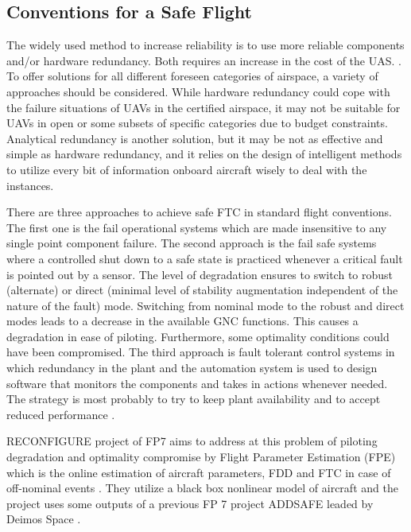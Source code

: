 \subsection{Conventions for a Safe Flight}\label{ch2:conventions}

The widely used method to increase reliability is to use more reliable components and/or hardware redundancy. 
Both requires an increase in the cost of the UAS.
\cite{angelov2012sense}. To offer solutions for all different foreseen categories of 
airspace, a variety of approaches should be considered. While hardware redundancy 
could cope with the failure situations of UAVs in the certified airspace, it may not be 
suitable for UAVs in open or some subsets of specific categories due to budget 
constraints. Analytical redundancy is another solution, but it may be not as effective and 
simple as hardware redundancy, and it relies on the design of intelligent methods to 
utilize every bit of information onboard aircraft wisely to deal with the instances.  

There are three approaches to achieve safe FTC in standard flight conventions. 
The first one is the fail operational systems which are made insensitive to any single 
point component failure. The second approach is the fail safe systems where a 
controlled shut down to a safe state is practiced whenever a critical fault is pointed 
out by a sensor. The level of degradation ensures to switch to robust (alternate) or 
direct (minimal level of stability augmentation independent of the nature of the fault) mode. 
Switching from nominal mode to the robust and direct modes leads to a decrease 
in the available GNC functions. This causes a degradation in ease of piloting. Furthermore, some optimality conditions could have been compromised. The third approach 
is fault tolerant control systems in which redundancy in the plant and the automation 
system is used to design software that monitors the components and takes in 
actions whenever needed. The strategy is most probably to try to keep plant availability 
and to accept reduced performance \cite{blanke2000fault}.

RECONFIGURE project of FP7 \cite{goupil2015overview} aims to address at this 
problem of piloting degradation and optimality compromise by Flight Parameter Estimation (FPE) which is the online estimation of aircraft parameters, FDD and FTC in case of off-nominal events \cite{RECONFIGURE}.
They utilize a black box nonlinear model of aircraft and the project uses some outputs of a previous FP 7 project ADDSAFE leaded by Deimos Space \cite{ADDSAFE}.

